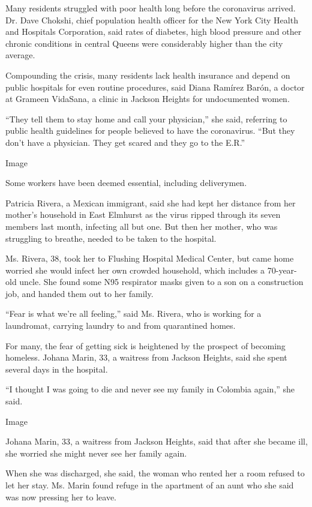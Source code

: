 Many residents struggled with poor health long before the coronavirus
arrived. Dr. Dave Chokshi, chief population health officer for the New
York City Health and Hospitals Corporation, said rates of diabetes, high
blood pressure and other chronic conditions in central Queens were
considerably higher than the city average.

Compounding the crisis, many residents lack health insurance and depend
on public hospitals for even routine procedures, said Diana Ramírez
Barón, a doctor at Grameen VidaSana, a clinic in Jackson Heights for
undocumented women.

``They tell them to stay home and call your physician,'' she said,
referring to public health guidelines for people believed to have the
coronavirus. ``But they don't have a physician. They get scared and they
go to the E.R.''

Image

Some workers have been deemed essential, including deliverymen.

Patricia Rivera, a Mexican immigrant, said she had kept her distance
from her mother's household in East Elmhurst as the virus ripped through
its seven members last month, infecting all but one. But then her
mother, who was struggling to breathe, needed to be taken to the
hospital.

Ms. Rivera, 38, took her to Flushing Hospital Medical Center, but came
home worried she would infect her own crowded household, which includes
a 70-year-old uncle. She found some N95 respirator masks given to a son
on a construction job, and handed them out to her family.

``Fear is what we're all feeling,'' said Ms. Rivera, who is working for
a laundromat, carrying laundry to and from quarantined homes.

For many, the fear of getting sick is heightened by the prospect of
becoming homeless. Johana Marin, 33, a waitress from Jackson Heights,
said she spent several days in the hospital.

``I thought I was going to die and never see my family in Colombia
again,'' she said.

Image

Johana Marin, 33, a waitress from Jackson Heights, said that after she
became ill, she worried she might never see her family again.

When she was discharged, she said, the woman who rented her a room
refused to let her stay. Ms. Marin found refuge in the apartment of an
aunt who she said was now pressing her to leave.


